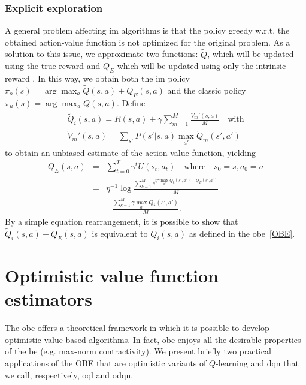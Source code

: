 \subsubsection{Explicit exploration} A general problem affecting \gls{im} algorithms is that the policy greedy w.r.t. the obtained action-value function is not optimized for the original problem. As a solution to this issue, we approximate two functions: $\tilde{Q}$, which will be updated using the true reward and $Q_E$ which will be updated using only the intrinsic reward \cite{szita2008many}. In this way, we obtain both the \gls{im} policy $\pi_o(s) = \arg \max_{a} \tilde{Q}(s,a) + Q_E(s,a)$ and the classic policy  $\pi_u(s) = \arg \max_{a} \tilde{Q}(s,a)$.
Define 
\begin{eqnarray}
	\tilde{Q}_i(s,a) = R(s,a) + \gamma \sum_{m=1}^M\frac{\tilde{V}_m'(s,a)}{M} \quad \text{with} \\
	\tilde{V}_m'(s,a) =  \sum_{s'} P(s'|s,a)\max_{a'}\tilde{Q}_m(s',a')
\end{eqnarray}
to obtain an unbiased estimate of the action-value function, yielding
\begin{eqnarray}
Q_E(s,a) & = & \sum_{t=0}^T \gamma^t U(s_t,a_t) \quad \text{where} \quad s_0 = s, a_0 = a \nonumber \\
& = & \eta^{-1}\log \frac{\sum_{k=1}^M e^{\eta\gamma\max_{a'}\tilde{Q}_k(s',a') + Q_E(s',a')}}{M}\nonumber \\
& &  -  \frac{\sum_{k=1}^M \gamma\max_{a'}\tilde{Q}_k(s',a')}{M}.
\end{eqnarray}
By a simple equation rearrangement, it is possible to show that $\tilde{Q}_i(s,a) + Q_E(s,a)$ is equivalent to $Q_i(s,a)$ as defined in the \gls{obe}~\eqref{OBE}.
 
\section{Optimistic value function estimators}
The \gls{obe} offers a theoretical framework in which it is possible to develop optimistic value based algorithms. In fact, \gls{obe} enjoys all the desirable properties of the \gls{be} (e.g. max-norm contractivity). We present briefly two practical applications of the OBE that are optimistic variants of $Q$-learning and \gls{dqn} that we call, respectively, \gls{oql} and \gls{odqn}.
